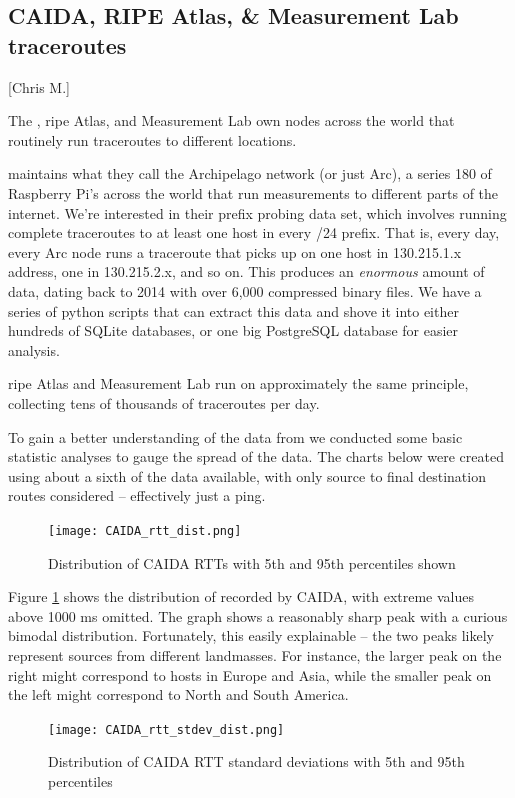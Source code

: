 \subsection{CAIDA, RIPE Atlas, \& Measurement Lab traceroutes}[Chris M.]

The \caida, \gls{ripe} Atlas, and Measurement Lab own nodes across the world that routinely run traceroutes to different locations. 

\caida maintains what they call the Archipelago network (or just Arc), a series \textapprox{}180 of Raspberry Pi's across the world that run measurements to different parts of the internet. We're interested in their prefix probing data set, which involves running complete traceroutes to at least one host in every /24 prefix. That is, every day, every Arc node runs a traceroute that picks up on one host in 130.215.1.x address, one in 130.215.2.x, and so on. This produces an \textit{enormous} amount of data, dating back to 2014 with over 6,000 compressed binary files. We have a series of python scripts that can extract this data and shove it into either hundreds of SQLite databases, or one big PostgreSQL database for easier analysis.

\gls{ripe} Atlas and Measurement Lab run on approximately the same principle, collecting tens of thousands of traceroutes per day.

To gain a better understanding of the data from \caida we conducted some basic statistic analyses to gauge the spread of the data. The charts below were created using about a sixth of the data available, with only source to final destination routes considered -- effectively just a ping.

\begin{figure}[H]
    \centering
    \texttt{[image: CAIDA\_rtt\_dist.png]}
    \caption{Distribution of CAIDA RTTs with 5th and 95th percentiles shown}
    \label{fig:rtt_dist}
\end{figure}

Figure \ref{fig:rtt_dist} shows the distribution of \rtts recorded by CAIDA, with extreme values above 1000 ms omitted. The graph shows a reasonably sharp peak with a curious bimodal distribution. Fortunately, this easily explainable -- the two peaks likely represent sources from different landmasses. For instance, the larger peak on the right might correspond to hosts in Europe and Asia, while the smaller peak on the left might correspond to North and South America.

\begin{figure}[H]
    \centering
    \texttt{[image: CAIDA\_rtt\_stdev\_dist.png]}
    \caption{Distribution of CAIDA RTT standard deviations with 5th and 95th percentiles}
    \label{fig:rtt_stdev_dist}
\end{figure}

